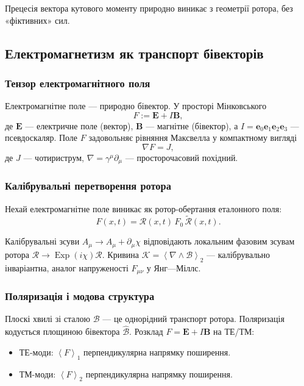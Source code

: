 \documentclass[11pt,a4paper]{article}
\newcommand{\e}{\mathbf{e}}
\newcommand{\grade}[2]{\left\langle #1 \right\rangle_{#2}}
\newcommand{\vecp}[1]{\grade{#1}{1}}
\newcommand{\biv}[1]{\grade{#1}{2}}
\newcommand{\rev}[1]{\widetilde{#1}}           %
\newcommand{\Exp}{\operatorname{Exp}}
\newcommand{\Rotor}{\mathcal{R}}
\newcommand{\Biv}{\mathcal{B}}
\newcommand{\D}{\nabla}                        %
\theoremstyle{definition}
\theoremstyle{plain}
\theoremstyle{remark}
\begin{document}
Прецесія вектора кутового моменту природно виникає з геометрії ротора, без «фіктивних» сил.

\subsection{Електромагнетизм як транспорт бівекторів}

\subsubsection{Тензор електромагнітного поля}

Електромагнітне поле — природно бівектор. У просторі Мінковського
\begin{equation}
F := \mathbf{E} + I\mathbf{B},
\end{equation}
де $\mathbf{E}$ — електричне поле (вектор), $\mathbf{B}$ — магнітне (бівектор), а $I = \e_0\e_1\e_2\e_3$ — псевдоскаляр. Поле $F$ задовольняє рівняння Максвелла у компактному вигляді
\begin{equation}
\D F = J,
\end{equation}
де $J$ — чотириструм, $\D = \gamma^\mu \partial_\mu$ — просторочасовий похідний.

\subsubsection{Калібрувальні перетворення ротора}

Нехай електромагнітне поле виникає як ротор-обертання еталонного поля:
\begin{equation}
F(x,t) = \Rotor(x,t)\, F_0\, \rev{\Rotor}(x,t).
\end{equation}

Калібрувальні зсуви $A_\mu \to A_\mu + \partial_\mu \chi$ відповідають локальним фазовим зсувам ротора $\Rotor \to \Exp(i\chi)\Rotor$. Кривина $\mathcal{K} = \biv{\D \wedge \Biv}$ — калібрувально інваріантна, аналог напруженості $F_{\mu\nu}$ у Янг—Міллс.

\subsubsection{Поляризація і модова структура}

Плоскі хвилі зі сталою $\Biv$ — це однорідний транспорт ротора. Поляризація кодується площиною бівектора $\hat{\Biv}$. Розклад $F = \mathbf{E} + I\mathbf{B}$ на ТЕ/ТМ:
\begin{itemize}
  \item ТЕ-моди: $\vecp{F}$ перпендикулярна напрямку поширення.
  \item ТМ-моди: $\biv{F}$ перпендикулярна напрямку поширення.
\end{itemize}
\end{document}
